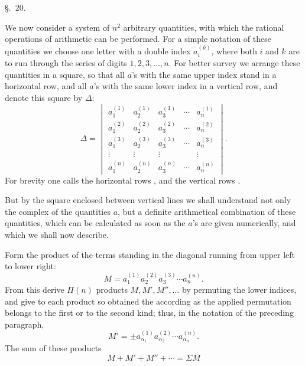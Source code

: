 
\begin{center}
{\large \S.\ 20.}

\vspace{0.5em}
{\large{}}
\end{center}

We now consider a system of \(n^2\) arbitrary quantities, with which the rational operations of arithmetic can be performed. For a simple notation of these quantities we choose one letter with a double index \(a_i^{(k)}\), where both \(i\) and \(k\) are to run through the series of digits \(1,2,3,\ldots,n\). For better survey we arrange these quantities in a square, so that all \(a\)'s with the same upper index stand in a horizontal row, and all \(a\)'s with the same lower index in a vertical row, and denote this square by \(\Delta\):
\begin{equation}
\Delta=
\begin{vmatrix}
 a_1^{(1)}&a_2^{(1)}&a_3^{(1)}&\cdots&a_n^{(1)}\\
 a_1^{(2)}&a_2^{(2)}&a_3^{(2)}&\cdots&a_n^{(2)}\\
 a_1^{(3)}&a_2^{(3)}&a_3^{(3)}&\cdots&a_n^{(3)}\\
 \vdots&\vdots&\vdots&&\vdots\\
 a_1^{(n)}&a_2^{(n)}&a_3^{(n)}&\cdots&a_n^{(n)}
\end{vmatrix}.
\tag{1}
\end{equation}
For brevity one calls the horizontal rows , and the vertical rows .

But by the square enclosed between vertical lines we shall understand not only the complex of the quantities \(a\), but a definite arithmetical combination of these quantities, which can be calculated as soon as the \(a\)'s are given numerically, and which we shall now describe.

Form the product of the terms standing in the diagonal running from upper left to lower right:
\begin{equation}
 M=a_1^{(1)}a_2^{(2)}a_3^{(3)}\cdots a_n^{(n)}.
\tag{2}
\end{equation}
From this derive \(\Pi(n)\) products \(M,M',M'',\ldots\) by permuting the lower indices, and give to each product so obtained the  according as the applied permutation belongs to the first or to the second kind; thus, in the notation of the preceding paragraph,
\begin{equation}
 M'=\pm a_{\alpha_1}^{(1)}a_{\alpha_2}^{(2)}\cdots a_{\alpha_n}^{(n)}.
\tag{3}
\end{equation}
The sum of these products
\[
M+M'+M''+\cdots=\Sigma M
\]
